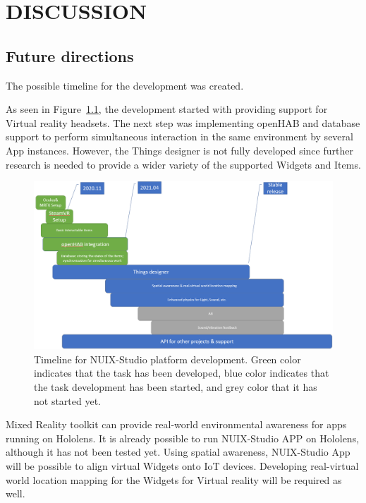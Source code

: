 
\chapter{DISCUSSION}

\section{Future directions}

The possible timeline for the development was created.

As seen in Figure~\ref{fig:Timeline-figure}, the development started with providing support for Virtual reality headsets. The next step was implementing openHAB and database support to perform simultaneous interaction in the same environment by several App instances. However, the Things designer is not fully developed since further research is needed to provide a wider variety of the supported Widgets and Items.

\begin{figure}
  \centering
  \includegraphics[width=0.9\linewidth]{figures/Timeline.png}
  \caption{Timeline for NUIX-Studio platform development. Green color indicates that the task has been developed, blue color indicates that the task development has been started, and grey color that it has not started yet.}
  \label{fig:Timeline-figure}
\end{figure}

Mixed Reality toolkit can provide real-world environmental awareness for apps running on Hololens. It is already possible to run NUIX-Studio APP on Hololens, although it has not been tested yet. Using spatial awareness, NUIX-Studio App will be possible to align virtual Widgets onto IoT devices. Developing real-virtual world location mapping for the Widgets for Virtual reality will be required as well.

